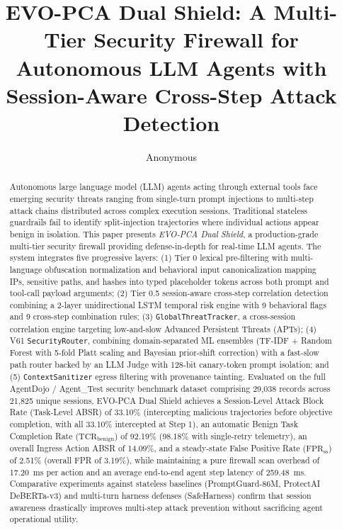 \documentclass[runningheads]{llncs}
\begin{document}
\title{EVO-PCA Dual Shield: A Multi-Tier Security Firewall for Autonomous LLM Agents with Session-Aware Cross-Step Attack Detection}

\author{Anonymous}
\institute{}

\maketitle

\begin{abstract}
Autonomous large language model (LLM) agents acting through external tools face emerging security threats ranging from single-turn prompt injections to multi-step attack chains distributed across complex execution sessions. Traditional stateless guardrails fail to identify split-injection trajectories where individual actions appear benign in isolation. This paper presents \textit{EVO-PCA Dual Shield}, a production-grade multi-tier security firewall providing defense-in-depth for real-time LLM agents. The system integrates five progressive layers: (1) Tier 0 lexical pre-filtering with multi-language obfuscation normalization and behavioral input canonicalization mapping IPs, sensitive paths, and hashes into typed placeholder tokens across both prompt and tool-call payload arguments; (2) Tier 0.5 session-aware cross-step correlation detection combining a 2-layer unidirectional LSTM temporal risk engine with 9 behavioral flags and 9 cross-step combination rules; (3) \texttt{GlobalThreatTracker}, a cross-session correlation engine targeting low-and-slow Advanced Persistent Threats (APTs); (4) V61 \texttt{SecurityRouter}, combining domain-separated ML ensembles (TF-IDF + Random Forest with 5-fold Platt scaling and Bayesian prior-shift correction) with a fast-slow path router backed by an LLM Judge with 128-bit canary-token prompt isolation; and (5) \texttt{ContextSanitizer} egress filtering with provenance tainting. Evaluated on the full AgentDojo / Agent\_Test security benchmark dataset comprising 29,038 records across 21,825 unique sessions, EVO-PCA Dual Shield achieves a Session-Level Attack Block Rate (Task-Level ABSR) of 33.10\% (intercepting malicious trajectories before objective completion, with all 33.10\% intercepted at Step 1), an automatic Benign Task Completion Rate ($\text{TCR}_{\text{benign}}$) of 92.19\% (98.18\% with single-retry telemetry), an overall Ingress Action ABSR of 14.09\%, and a steady-state False Positive Rate ($\text{FPR}_{\text{ss}}$) of 2.51\% (overall FPR of 3.19\%), while maintaining a pure firewall scan overhead of 17.20~ms per action and an average end-to-end agent step latency of 259.48~ms. Comparative experiments against stateless baselines (PromptGuard-86M, ProtectAI DeBERTa-v3) and multi-turn harness defenses (SafeHarness) confirm that session awareness drastically improves multi-step attack prevention without sacrificing agent operational utility.

\end{abstract}
\end{document}
